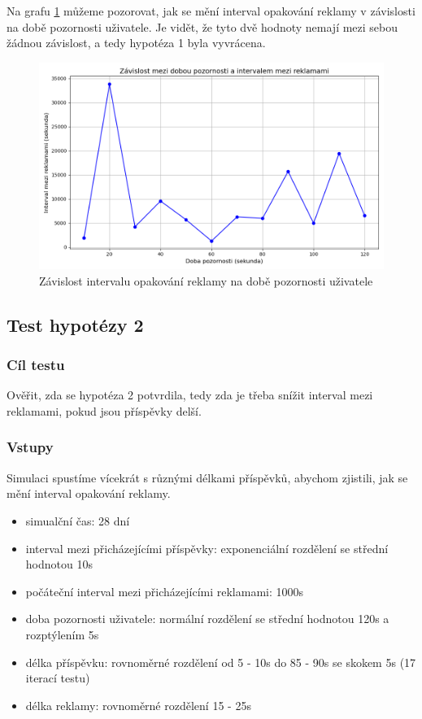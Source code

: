 \documentclass[11pt, a4paper]{article}
\begin{document}
Na grafu \ref{fig:attention_time_vs_ad_interval} můžeme pozorovat, jak se mění interval opakování reklamy v závislosti na době pozornosti uživatele.
Je vidět, že tyto dvě hodnoty nemají mezi sebou žádnou závislost, a tedy hypotéza 1 byla vyvrácena.
\begin{figure}[h]
    \centering
    \includegraphics[width=\linewidth]{attention_time_vs_ad_interval.png}
    \caption{Závislost intervalu opakování reklamy na době pozornosti uživatele}
    \label{fig:attention_time_vs_ad_interval}
\end{figure}

\newpage

\subsection{Test hypotézy 2}

\subsubsection{Cíl testu}
Ověřit, zda se hypotéza 2 potvrdila, tedy zda je třeba snížit interval mezi reklamami, pokud jsou příspěvky delší.
\subsubsection{Vstupy}
Simulaci spustíme vícekrát s různými délkami příspěvků, abychom zjistili, jak se mění interval opakování reklamy.
\begin{itemize}
    \item simualční čas: 28 dní
    \item interval mezi přicházejícími příspěvky: exponenciální rozdělení se střední hodnotou 10s
    \item počáteční interval mezi přicházejícími reklamami: 1000s
    \item doba pozornosti uživatele: normální rozdělení se střední hodnotou 120s a rozptýlením 5s
    \item délka příspěvku: rovnoměrné rozdělení od 5 - 10s do 85 - 90s se skokem 5s (17 iterací testu)
    \item délka reklamy: rovnoměrné rozdělení 15 - 25s
\end{itemize}
\end{document}
